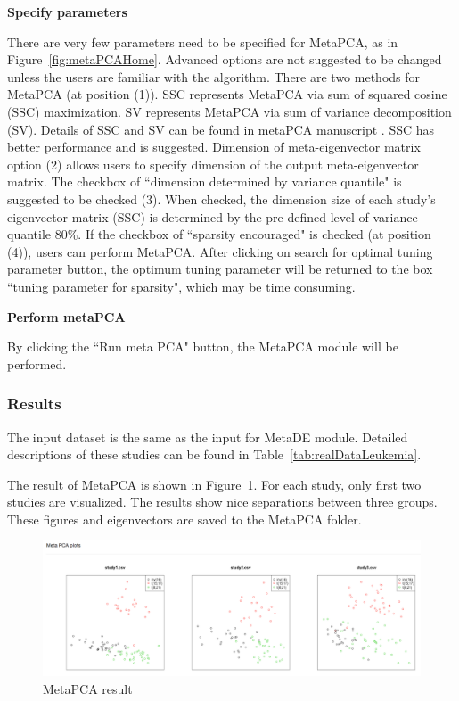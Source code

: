 \begin{steps}

\item \textbf{Specify parameters} 

There are very few parameters need to be specified for MetaPCA, as in Figure~\ref{fig:metaPCAHome}.
Advanced options are not suggested to be changed unless the users are familiar with the algorithm.
There are two methods for MetaPCA (at position {\color{red} (1)}). 
SSC represents MetaPCA via sum of squared cosine (SSC) maximization.
SV represents MetaPCA via sum of variance decomposition (SV).
Details of SSC and SV can be found in metaPCA manuscript \citep{kim2017meta}.
SSC has better performance and is suggested.
Dimension of meta-eigenvector matrix option {\color{red} (2)} allows users to specify dimension of the output meta-eigenvector matrix.
The checkbox of ``dimension determined by variance quantile" is suggested to be checked {\color{red} (3)}.
When checked, the dimension size of each study's eigenvector matrix (SSC) is determined  by the pre-defined level of variance quantile 80\%.
If the checkbox of ``sparsity encouraged" is checked (at position {\color{red} (4)}), users can perform MetaPCA.
After clicking on search for optimal tuning parameter button, the optimum tuning parameter will be returned to the box ``tuning parameter for sparsity", 
which may be time consuming.

\item \textbf{Perform metaPCA} 

By clicking the ``Run meta PCA" button, the MetaPCA module will be performed.


\end{steps}


\subsubsection{Results}
The input dataset is the same as the input for MetaDE module.
Detailed descriptions of these studies can be found in Table~\ref{tab:realDataLeukemia}. 

The result of MetaPCA is shown in Figure~\ref{fig:metaPCAresult}.
For each study, only first two studies are visualized.
The results show nice separations between three groups.
These figures and eigenvectors are saved to the MetaPCA folder.

\begin{figure}[H]
\begin{center}
\includegraphics[scale=0.3]{./figure/metaPCA/metaPCA}
\caption{MetaPCA result}
\label{fig:metaPCAresult}
\end{center}
\end{figure}

